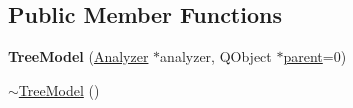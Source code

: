 \subsection*{Public Member Functions}
\begin{DoxyCompactItemize}
\item 
\hypertarget{class_tree_model_a56ad116e64f77e99fdf4fb419a8f3001}{{\bfseries Tree\-Model} (\hyperlink{class_analyzer}{Analyzer} $\ast$analyzer, Q\-Object $\ast$\hyperlink{class_tree_model_a210d05503fb8758b7bad1c4fd4c5ae6b}{parent}=0)}\label{class_tree_model_a56ad116e64f77e99fdf4fb419a8f3001}

\item 
\hypertarget{class_tree_model_af0998d55a63c2b18be1f03e4e8567926}{\hyperlink{class_tree_model_af0998d55a63c2b18be1f03e4e8567926}{$\sim$\-Tree\-Model} ()}\label{class_tree_model_af0998d55a63c2b18be1f03e4e8567926}


\end{DoxyCompactItemize}
